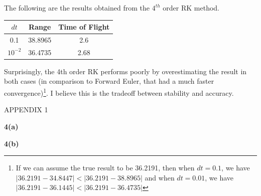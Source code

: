 \documentclass[12pt]{article}
\begin{document}
\noindent The following are the results obtained from the $4^{th}$ order RK method. 
\begin{center}
	\begin{tabular}{||c c c||} 
		\hline
		$dt$ & Range & Time of Flight \\ [0.5ex] 
		\hline\hline
		0.1 & 38.8965 & 2.6  \\ 
		\hline
		$10^{-2}$ & 36.4735 & 2.68  \\
		\hline
	\end{tabular}
\end{center}
Surprisingly, the 4th order RK performs poorly by overestimating the result in both cases (in comparison to Forward Euler, that had a much faster convergence)\footnote{If we can assume the true result to be 36.2191, then when $dt = 0.1$, we have \\ $|36.2191 - 34.8447| < |36.2191 - 38.8965|$ and when $dt = 0.01$, we have $|36.2191 - 36.1445| < |36.2191 - 36.4735|$}. I believe this is the tradeoff between stability and accuracy. 

\newpage 
\begin{center}
APPENDIX 1 
\end{center}
\noindent \textbf{4(a)}


\newpage  
\noindent \textbf{4(b)}
\end{document}
